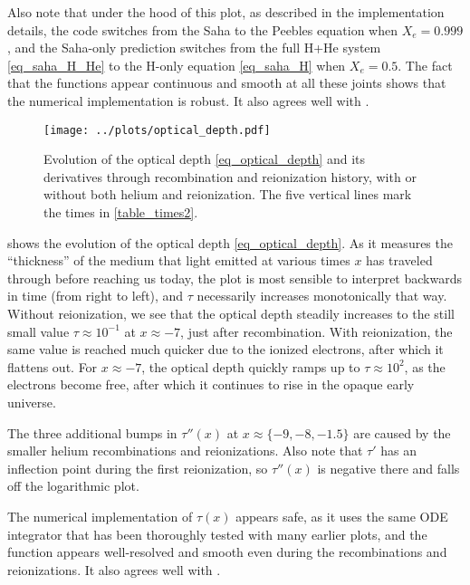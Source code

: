\documentclass[10pt,a4paper]{article}
\begin{document}
Also note that under the hood of this plot, as described in the implementation details,
the code switches from the Saha to the Peebles equation when $X_e = 0.999$,
and the Saha-only prediction switches from the full H+He system \eqref{eq_saha_H_He} to the H-only equation \eqref{eq_saha_H} when $X_e = 0.5$.
The fact that the functions appear continuous and smooth at all these joints shows that the numerical implementation is robust.
It also agrees well with \cite[\textsc{fig. 1}]{callinHowCalculateCMB2006}.

\begin{figure}
	\centering
	\texttt{[image: ../plots/optical\_depth.pdf]}
	\caption{%
		Evolution of the optical depth \eqref{eq_optical_depth} and its derivatives through recombination and reionization history, with or without both helium and reionization.
		The five vertical lines mark the times in \cref{table_times2}.
	}
	\label{fig_optical_depth}
\end{figure}

 shows the evolution of the optical depth \eqref{eq_optical_depth}.
As it measures the ``thickness'' of the medium that light emitted at various times $x$ has traveled through before reaching us today,
the plot is most sensible to interpret backwards in time (from right to left), and $\tau$ necessarily increases monotonically that way.
Without reionization, we see that the optical depth steadily increases to the still small value $\tau \approx 10^{-1}$ at $x \approx -7$, just after recombination.
With reionization, the same value is reached much quicker due to the ionized electrons, after which it flattens out.
For $x \approx -7$, the optical depth quickly ramps up to $\tau \approx 10^{2}$, as the electrons become free,
after which it continues to rise in the opaque early universe.

The three additional bumps in $\tau''(x)$ at $x \approx \{-9, -8, -1.5\}$ are caused by the smaller helium recombinations and reionizations.
Also note that $\tau'$ has an inflection point during the first reionization,
so $\tau''(x)$ is negative there and falls off the logarithmic plot.

The numerical implementation of $\tau(x)$ appears safe, as it uses the same ODE integrator that has been thoroughly tested with many earlier plots,
and the function appears well-resolved and smooth even during the recombinations and reionizations.
It also agrees well with \cite[\textsc{fig. 2}]{callinHowCalculateCMB2006}.
\end{document}
